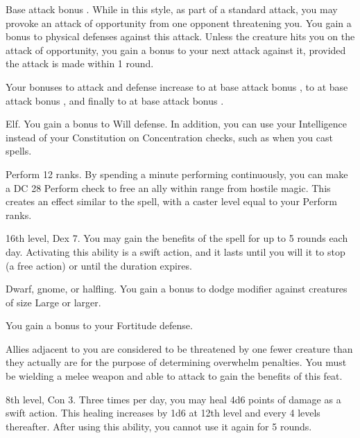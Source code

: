 \featpre Base attack bonus .
\featben While in this style, as part of a standard attack, you may provoke an attack of opportunity from one opponent threatening you. You gain a  bonus to physical defenses against this attack. Unless the creature hits you on the attack of opportunity, you gain a  bonus to your next attack against it, provided the attack is made within 1 round.

Your bonuses to attack and defense increase to  at base attack bonus , to  at base attack bonus , and finally to  at base attack bonus .

 Elf.
 You gain a  bonus to Will defense. In addition, you can use your Intelligence instead of your Constitution on Concentration checks, such as when you cast spells.

\featpre Perform 12 ranks.
\featben By spending a minute performing continuously, you can make a DC 28 Perform check to free an ally within \rngmed range from hostile magic. This creates an effect similar to the  spell, with a caster level equal to your Perform ranks.

\featpre 16th level, Dex 7.
\featben You may gain the benefits of the  spell for up to 5 rounds each day. Activating this ability is a swift action, and it lasts until you will it to stop (a free action) or until the duration expires.

 Dwarf, gnome, or halfling.
 You gain a  bonus to dodge modifier against creatures of size Large or larger.

 You gain a  bonus to your Fortitude defense.

 Allies adjacent to you are considered to be threatened by one fewer creature than they actually are for the purpose of determining overwhelm penalties. You must be wielding a melee weapon and able to attack to gain the benefits of this feat.

\featpre 8th level, Con 3.
\featben Three times per day, you may heal 4d6 points of damage as a swift action. This healing increases by 1d6 at 12th level and every 4 levels thereafter. After using this ability, you cannot use it again for 5 rounds.

